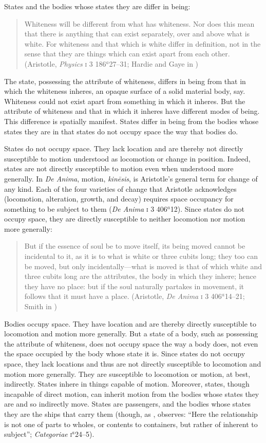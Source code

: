 States and the bodies whose states they are differ in being:
\begin{quote}
	Whiteness will be different from what has whiteness. Nor does this mean that there is anything that can exist separately, over and above what is white. For whiteness and that which is white differ in definition, not in the sense that they are things which can exist apart from each other. (Aristotle, \emph{Physics} \textsc{i} 3 186\( ^{a} \)27--31; Hardie and Gaye in \citealt[6]{Barnes:1984uq})
\end{quote}
The state, possessing the attribute of whiteness, differs in being from that in which the whiteness inheres, an opaque surface of a solid material body, say. Whiteness could not exist apart from something in which it inheres. But the attribute of whiteness and that in which it inheres have different modes of being. This difference is spatially manifest. States differ in being from the bodies whose states they are in that states do not occupy space the way that bodies do. 

States do not occupy space. They lack location and are there\-by not directly susceptible to motion understood as locomotion or change in position. Indeed, states are not directly susceptible to motion even when understood more generally. In \emph{De Anima}, motion, \emph{kinēsis}, is Aristotle's general term for change of any kind. Each of the four varieties of change that Aristotle acknowledges (locomotion, alteration, growth, and decay) requires space occupancy for something to be subject to them (\emph{De Anima} \textsc{i} 3 406\( ^{a} \)12). Since states do not occupy space, they are directly susceptible to neither locomotion nor motion more generally:
\begin{quote}
	But if the essence of soul be to move itself, its being moved cannot be incidental to it, as it is to what is white or three cubits long; they too can be moved, but only incidentally---what is moved is that of which white and three cubits long are the attributes, the body in which they inhere; hence they have no place: but if the soul naturally partakes in movement, it follows that it must have a place. (Aristotle, \emph{De Anima} \textsc{i} 3 406\( ^{a} \)14--21; Smith in \citealt[9]{Barnes:1984uq})
\end{quote}
Bodies occupy space. They have location and are there\-by directly susceptible to locomotion and motion more generally. But a state of a body, such as possessing the attribute of whiteness, does not occupy space the way a body does, not even the space occupied by the body whose state it is. Since states do not occupy space, they lack locations and thus are not directly susceptible to locomotion and motion more generally. They are susceptible to locomotion or motion, at best, indirectly. States inhere in things capable of motion. Moreover, states, though incapable of direct motion, can inherit motion from the bodies whose states they are and so indirectly move.  States are passengers, and the bodies whose states they are the ships that carry them (though, as \citealt[174]{Witt:1995kx}, observes: ``Here the relationship is not one of parts to wholes, or contents to containers, but rather of inherent to subject''; \emph{Categoriae} \textsc{i}\( ^{a} \)24--5).

